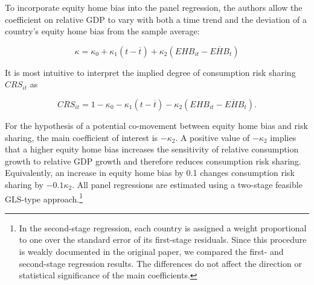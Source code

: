 \documentclass[11pt,a4paper]{article}
\begin{document}
To incorporate equity home bias into the panel regression, the authors allow the
coefficient on relative GDP to vary with both a time trend and the deviation of
a country's equity home bias from the sample average:

\begin{equation}
\kappa
=
\kappa_0
+
\kappa_1(t - \overline{t})
+
\kappa_2(EHB_{it} - \overline{EHB}_t)
\end{equation}


It is most intuitive to interpret the implied degree of consumption risk sharing \(CRS_{it}\) as

\begin{equation}
CRS_{it}
=
1 - \kappa_0
-
\kappa_1(t - \overline{t})
-
\kappa_2(EHB_{it} - \overline{EHB}_t).
\end{equation}

For the hypothesis of a potential co-movement between equity home bias and risk
sharing, the main coefficient of interest is \(-\kappa_2\). A positive value of \(-\kappa_2\) implies that a higher equity home bias
increases the sensitivity of relative consumption growth to relative GDP growth and therefore
reduces consumption risk sharing. Equivalently, an increase in equity home bias by 0.1
changes consumption risk sharing by \(-0.1\kappa_2\).
All panel regressions are estimated using a two-stage feasible GLS-type approach.\footnote{In the second-stage regression, each country is assigned a weight proportional to one over the standard error of its first-stage residuals. Since this
procedure is weakly documented in the original paper, we compared the first- and
second-stage regression results. The differences do not affect the direction or
statistical significance of the main coefficients.}
\end{document}

